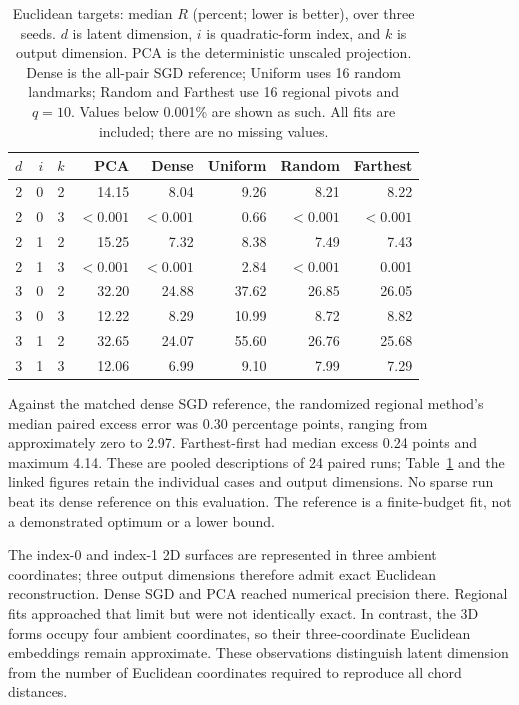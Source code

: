 \documentclass[11pt,letterpaper]{article}
\begin{document}
\begin{table}[ht]\centering\small
\caption{Euclidean targets: median $R$ (percent; lower is better), over three
seeds. $d$ is latent dimension, $i$ is quadratic-form index, and $k$ is output
dimension. PCA is the deterministic unscaled projection. Dense is the all-pair
SGD reference; Uniform uses 16 random landmarks; Random and Farthest use 16
regional pivots and $q=10$. Values below 0.001\% are shown as such. All fits
are included; there are no missing values.}\label{tab:euclidean}
\begin{tabular}{rrr rrrrr}\toprule
$d$ & $i$ & $k$ & PCA & Dense & Uniform & Random & Farthest\\\midrule
2 & 0 & 2 & 14.15 & 8.04 & 9.26 & 8.21 & 8.22 \\
2 & 0 & 3 & $<0.001$ & $<0.001$ & 0.66 & $<0.001$ & $<0.001$ \\
2 & 1 & 2 & 15.25 & 7.32 & 8.38 & 7.49 & 7.43 \\
2 & 1 & 3 & $<0.001$ & $<0.001$ & 2.84 & $<0.001$ & 0.001 \\
3 & 0 & 2 & 32.20 & 24.88 & 37.62 & 26.85 & 26.05 \\
3 & 0 & 3 & 12.22 & 8.29 & 10.99 & 8.72 & 8.82 \\
3 & 1 & 2 & 32.65 & 24.07 & 55.60 & 26.76 & 25.68 \\
3 & 1 & 3 & 12.06 & 6.99 & 9.10 & 7.99 & 7.29 \\
\bottomrule\end{tabular}\end{table}

Against the matched dense SGD reference, the randomized regional method's median
paired excess error was 0.30 percentage points, ranging from approximately zero
to 2.97. Farthest-first had median excess 0.24 points and maximum 4.14. These are
pooled descriptions of 24 paired runs; Table~\ref{tab:euclidean} and the linked
figures retain the individual cases and output dimensions. No sparse run beat
its dense reference on this evaluation. The reference is a finite-budget fit,
not a demonstrated optimum or a lower bound.

The index-0 and index-1 2D surfaces are represented in three ambient coordinates;
three output dimensions therefore admit exact Euclidean reconstruction. Dense
SGD and PCA reached numerical precision there. Regional fits approached that
limit but were not identically exact. In contrast, the 3D forms occupy four
ambient coordinates, so their three-coordinate Euclidean embeddings remain
approximate. These observations distinguish latent dimension from the number
of Euclidean coordinates required to reproduce all chord distances.
\end{document}
